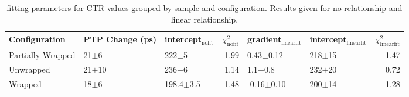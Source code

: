\begin{table}
\caption{\label{tab:ctrfit-20-results} fitting parameters for CTR values grouped by sample and configuration. Results given for no relationship and linear relationship.}
\begin{tabular}{lllrllr}
\hline
Configuration & PTP Change (ps) & intercept$_\text{nofit}$ &  $\chi^2_\text{nofit}$ & gradient$_\text{linearfit}$ & intercept$_\text{linearfit}$ &  $\chi^2_\text{linearfit}$ \\
\hline
Partially Wrapped   &   21$\pm$6 &       222$\pm$5 &                   1.99 &       0.43$\pm$0.12 &         218$\pm$15 &                    1.47 \\
Unwrapped     &  21$\pm$10 &       236$\pm$6 &                   1.14 &         1.1$\pm$0.8 &         232$\pm$20 &                    0.72 \\
Wrapped       &   18$\pm$6 &   198.4$\pm$3.5 &                   1.48 &      -0.16$\pm$0.10 &         200$\pm$14 &                    1.28 \\
\hline
\end{tabular}
\end{table}